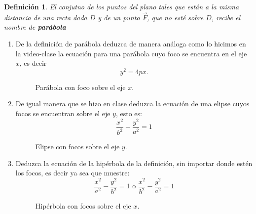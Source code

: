 \documentclass[letterpaper,11pt]{article}
\newtheorem{definition}{Definición}
\begin{document}
\begin{definition}
	El conjutno de los puntos del plano tales que están a la misma distancia de una recta dada $ D $ y de un punto $ \vec{F} $, que no esté sobre $ D $, recibe el nombre de \textbf{parábola}
\end{definition}
\begin{enumerate}


\item  De la definición de parábola deduzca de manera análoga como lo hicimos en la video-clase la ecuación para una parábola cuyo foco se encuentra en el eje $x$, es decir $$y^2 = 4px.$$ 


\begin{figure}[h!]
\centering
\caption{Parábola con foco sobre el eje $x$.}
\label{F1}
\end{figure}

\newpage
\item De igual manera que se hizo en clase deduzca la ecuación de una elipse cuyos focos se encuentran sobre el eje $y$, esto es: $$\dfrac{x^2}{b^2} + \dfrac{y^2}{a^2}=1$$

\begin{figure}[h!]
\centering
\caption{Elipse con focos sobre el eje $y$.}
\label{F1}
\end{figure}



\item Deduzca la ecuación de la hipérbola de la definición, sin importar donde estén los focos, es decir ya sea que muestre: $$\dfrac{x^2}{a^2} -  \dfrac{y^2}{b^2} = 1 \text{ o }  \dfrac{x^2}{b^2} - \dfrac{y^2}{a^2}=1$$

\begin{figure}[h!]
\centering
\caption{Hipérbola con focos sobre el eje $x$.}
\label{F1}
\end{figure}




\end{enumerate}
\end{document}
